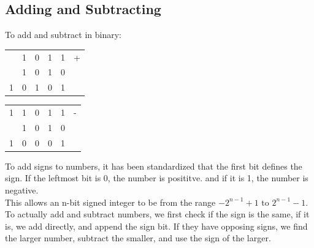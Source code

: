 \documentclass[nobib]{tufte-handout}
\begin{document}
\subsection{Adding and Subtracting}
To add and subtract in binary:\\
\begin{table}
    \centering
    \begin{tabular}{c c c c c c}
          & 1 & 0 & 1 & 1 & + \\
          & 1 & 0 & 1 & 0 &   \\
        \hline
        1 & 0 & 1 & 0 & 1
    \end{tabular}
    \quad\quad
    \begin{tabular}{c c c c c c}
        1 & 1 & 0 & 1 & 1 & - \\
          & 1 & 0 & 1 & 0 &   \\
        \hline
        1 & 0 & 0 & 0 & 1 &
    \end{tabular}
\end{table}
To add signs to numbers, it has been standardized that the first bit defines the sign. If the leftmost bit is 0, the number is posititve. and if it is 1, the number is negative. \\This allows an n-bit signed integer to be from the range $-2^{n-1}+1 \text{ to } 2^{n-1}-1.$\\
To actually add and subtract numbers, we first check if the sign is the same, if it is, we add directly, and append the sign bit. If they have opposing signs, we find the larger number, subtract the smaller, and use the sign of the larger.\\
\end{document}
